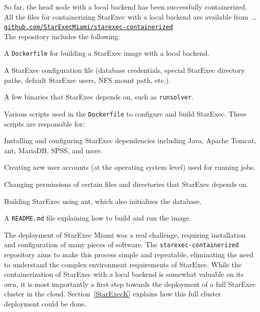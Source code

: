\documentclass{easychair}
\newenvironment{packed_itemize}{
\vspace*{-0.3em}
\begin{itemize}
\setlength{\partopsep}{0pt}
\setlength{\itemsep}{1pt}
\setlength{\parskip}{0pt}
\setlength{\parsep}{0pt}
}{\end{itemize}}
\begin{document}
So far, the head node with a local backend has been successfully containerized.
All the files for containerizing StarExec with a local backend are available from~\ldots \\
\hspace*{1cm}\href{https://github.com/StarExecMiami/starexec-containerized}{\tt github.com/StarExecMiami/starexec-containerized}\\
The repository includes the following:
\begin{packed_itemize}
\item A {\tt Dockerfile} for building a StarExec image with a local backend.
\item A StarExec configuration file (database credentials, special StarExec directory paths, 
      default StarExec users, NFS mount path, etc.).
\item A few binaries that StarExec depends on, such as {\tt runsolver}.
\item Various scripts used in the {\tt Dockerfile} to configure and build StarExec.
      These scripts are responsible for: 
      \begin{packed_itemize}
      \item Installing and configuring StarExec dependencies including Java, Apache Tomcat, ant, 
            MariaDB, SPSS, and more.
      \item Creating new user accounts (at the operating system level) used for running jobs.
      \item Changing permissions of certain files and directories that StarExec depends on.
      \item Building StarExec using ant, which also initializes the database.
      \end{packed_itemize}
\item A {\tt README.md} file explaining how to build and run the image.
\end{packed_itemize}

The deployment of StarExec Miami was a real challenge, requiring installation and configuration 
of many pieces of software.
The {\tt starexec-containerized} repository aims to make this process simple and repeatable, 
eliminating the need to understand the complex environment requirements of StarExec. 
While the containerization of StarExec with a local backend is somewhat valuable on its own,
it is most importantly a first step towards the deployment of a full StarExec cluster in the cloud.
Section~\ref{StarExecK} explains how this full cluster deployment could be done.
\end{document}
